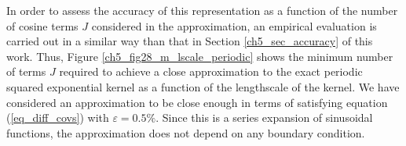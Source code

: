 \documentclass[onecolumn,a4paper,11pt]{article}
\begin{document}


In order to assess the accuracy of this representation as a function of the number of cosine terms $J$ considered in the approximation, an empirical evaluation is carried out in a similar way than that in Section \ref{ch5_sec_accuracy} of this work. Thus, Figure \ref{ch5_fig28_m_lscale_periodic} shows the minimum number of terms $J$ required to achieve a close approximation to the exact periodic squared exponential kernel as a function of the lengthscale of the kernel. We have considered an approximation to be close enough in terms of satisfying equation (\ref{eq_diff_covs}) with $\varepsilon=0.5\%$. Since this is a series expansion of sinusoidal functions, the approximation does not depend on any boundary condition.
\end{document}
